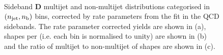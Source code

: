 \clearpage

\begin{figure}[!h]
  \centering
   \\
  \caption{Sideband \textbf{D} multijet and non-multijet distributions
    categorised in $(n_{\text{jet}}, n_{\text{b}})$ bins, corrected by rate parameters
    from the fit in the QCD sidebands. The rate parameter corrected yields
    are shown in (a), \nb shapes per \njet (i.e. each \njet bin is normalised
    to unity) are shown in (b) and the ratio of multijet to non-multijet of
    \nb shapes are shown in (c).}
  \label{fig:qcd_nb_shapes_doublesb}
\end{figure}

